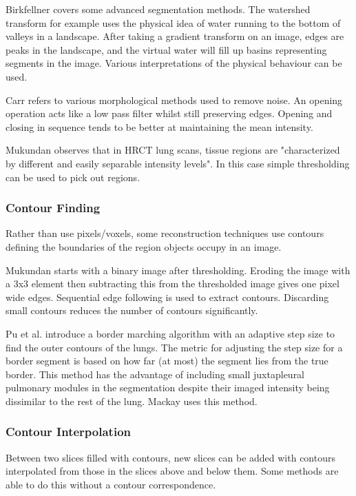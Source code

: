 \documentclass[11p, titlepage]{article}
\begin{document}
Birkfellner \cite{birkfellner2016applied} covers some advanced segmentation methods. The watershed transform for example uses the physical idea of water running to the bottom of valleys in a landscape. After taking a gradient transform on an image, edges are peaks in the landscape, and the virtual water will fill up basins representing segments in the image. Various interpretations of the physical behaviour can be used.

Carr \cite{carr1996surface} refers to various morphological methods used to remove noise. An opening operation acts like a low pass filter whilst still preserving edges. Opening and closing in sequence tends to be better at maintaining the mean intensity.

Mukundan \cite{mukundan2016reconstruction} observes that in HRCT lung scans, tissue regions are "characterized by different and easily separable intensity levels". In this case simple thresholding can be used to pick out regions. 

\subsubsection{Contour Finding}

Rather than use pixels/voxels, some reconstruction techniques use contours defining the boundaries of the region objects occupy in an image. 

Mukundan \cite{mukundan2016reconstruction} starts with a binary image after thresholding. Eroding the image with a 3x3 element then subtracting this from the thresholded image gives one pixel wide edges. Sequential edge following is used to extract contours. Discarding small contours reduces the number of contours significantly.

Pu et al. \cite{pu2008adaptive} introduce a border marching algorithm with an adaptive step size to find the outer contours of the lungs. The metric for adjusting the step size for a border segment is based on how far (at most) the segment lies from the true border. This method has the advantage of including small juxtapleural pulmonary modules in the segmentation despite their imaged intensity being dissimilar to the rest of the lung. Mackay \cite{mackay2019robust} uses this method.

\subsubsection{Contour Interpolation}

Between two slices filled with contours, new slices can be added with contours interpolated from those in the slices above and below them. Some methods are able to do this without a contour correspondence.
\end{document}
